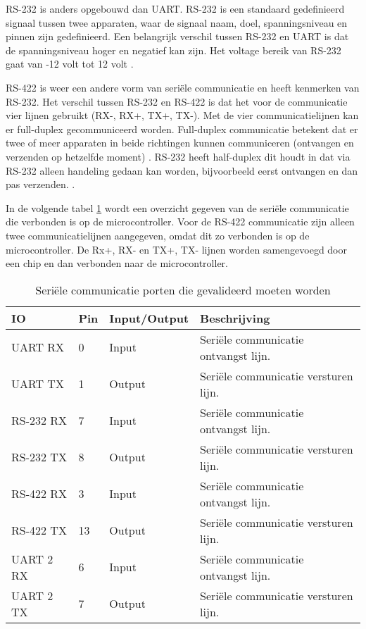 \noindent RS-232 is anders opgebouwd dan UART. RS-232 is een standaard gedefinieerd signaal tussen twee apparaten, waar de signaal naam, doel, spanningsniveau en pinnen zijn gedefinieerd. Een belangrijk verschil tussen RS-232 en UART is dat de spanningsniveau hoger en negatief kan zijn. Het voltage bereik van RS-232 gaat van -12 volt tot 12 volt \autocite{RS232}. \newline

\noindent RS-422 is weer een andere vorm van seriële communicatie en heeft kenmerken van RS-232. Het verschil tussen RS-232 en RS-422 is dat het voor de communicatie vier lijnen gebruikt (RX-, RX+, TX+, TX-). Met de vier communicatielijnen kan er full-duplex gecommuniceerd worden. Full-duplex communicatie betekent dat er twee of meer apparaten in beide richtingen kunnen communiceren (ontvangen en verzenden op hetzelfde moment) \autocite{FullDuplex}. RS-232 heeft half-duplex dit houdt in dat via RS-232 alleen handeling gedaan kan worden, bijvoorbeeld eerst ontvangen en dan pas verzenden. \autocite{RS422}. \newline

\noindent In de volgende tabel \ref{tab:hw_val_serieel} wordt een overzicht gegeven van de seriële communicatie die verbonden is op de microcontroller. Voor de RS-422 communicatie zijn alleen twee communicatielijnen aangegeven, omdat dit zo verbonden is op de microcontroller. De Rx+, RX- en TX+, TX- lijnen worden samengevoegd door een chip en dan verbonden naar de microcontroller.
\begin{table}[h!]
	\caption{Seriële communicatie porten die gevalideerd moeten worden}
	\begin{tabular}{lllp{9cm}}
	\toprule
\textbf{IO} & \textbf{Pin} & \textbf{Input/Output} & \textbf{Beschrijving}	\\ \toprule
	UART RX		& 0    	& Input		& Seriële communicatie ontvangst lijn.			\\
	UART TX		& 1    	& Output	& Seriële communicatie versturen lijn.			\\
	RS-232 RX	& 7    	& Input		& Seriële communicatie ontvangst lijn.			\\
	RS-232 TX	& 8    	& Output	& Seriële communicatie versturen lijn.			\\
	RS-422 RX	& 3    	& Input		& Seriële communicatie ontvangst lijn.			\\
	RS-422 TX	& 13   	& Output	& Seriële communicatie versturen lijn.			\\
	UART 2 RX	& 6    	& Input		& Seriële communicatie ontvangst lijn.			\\
	UART 2 TX	& 7   	& Output	& Seriële communicatie versturen lijn.			\\ \bottomrule
	\end{tabular}
	\label{tab:hw_val_serieel}
\end{table}